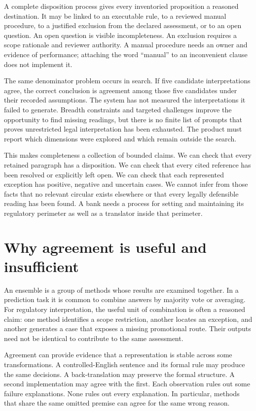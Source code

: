 A complete disposition process gives every inventoried proposition a reasoned
destination. It may be linked to an executable rule, to a reviewed manual
procedure, to a justified exclusion from the declared assessment, or to an open
question. An open question is visible incompleteness. An exclusion requires a
scope rationale and reviewer authority. A manual procedure needs an owner and
evidence of performance; attaching the word ``manual'' to an inconvenient clause
does not implement it.

The same denominator problem occurs in search. If five candidate interpretations
agree, the correct conclusion is agreement among those five candidates under
their recorded assumptions. The system has not measured the interpretations it
failed to generate. Breadth constraints and targeted challenges improve the
opportunity to find missing readings, but there is no finite list of prompts
that proves unrestricted legal interpretation has been exhausted. The product
must report which dimensions were explored and which remain outside the search.

This makes completeness a collection of bounded claims. We can check that every
retained paragraph has a disposition. We can check that every cited reference has
been resolved or explicitly left open. We can check that each represented
exception has positive, negative and uncertain cases. We cannot infer from those
facts that no relevant circular exists elsewhere or that every legally
defensible reading has been found. A bank needs a process for setting and
maintaining its regulatory perimeter as well as a translator inside that perimeter.

\section{Why agreement is useful and insufficient}
\label{sec:problem-agreement}
An ensemble is a group of methods whose results are examined together. In a
prediction task it is common to combine answers by majority vote or averaging.
For regulatory interpretation, the useful unit of combination is often a
reasoned claim: one method identifies a scope restriction, another locates an
exception, and another generates a case that exposes a missing promotional route.
Their outputs need not be identical to contribute to the same assessment.

Agreement can provide evidence that a representation is stable across some
transformations. A controlled-English sentence and its formal rule may produce
the same decisions. A back-translation may preserve the formal structure. A
second implementation may agree with the first. Each observation rules out some
failure explanations. None rules out every explanation. In particular, methods
that share the same omitted premise can agree for the same wrong reason.


